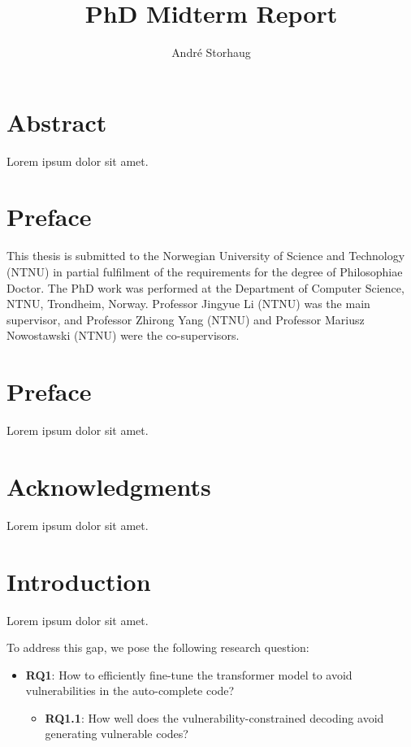 \documentclass[12pt]{book}
\title{PhD Midterm Report}
\author{Andr\'e Storhaug}
\begin{document}
\maketitle


\chapter{Abstract}

Lorem ipsum dolor sit amet.

\chapter{Preface}
This thesis is submitted to the Norwegian University of Science and Technology (NTNU) in partial fulfilment of the requirements for the degree of Philosophiae Doctor.
The PhD work was performed at the Department of Computer Science, NTNU, Trondheim, Norway. Professor Jingyue Li (NTNU) was the main supervisor, and Professor Zhirong Yang (NTNU) and Professor Mariusz Nowostawski (NTNU) were the co-supervisors.


\chapter*{Preface}
Lorem ipsum dolor sit amet.

\chapter*{Acknowledgments}
Lorem ipsum dolor sit amet.

\tableofcontents
\listoftables
\listoffigures

\chapter{Introduction}
Lorem ipsum dolor sit amet.

To address this gap, we pose the following research question:
\begin{itemize}
    \item \textbf{RQ1}: How to efficiently fine-tune the transformer model
to avoid vulnerabilities in the auto-complete code?
    \begin{itemize}
        \item \textbf{RQ1.1}: How well does the vulnerability-constrained decoding
avoid generating vulnerable codes?
    \end{itemize}
\end{itemize}
\end{document}
